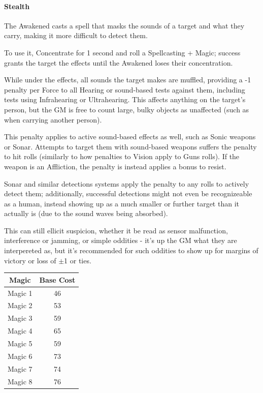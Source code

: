 \begin{multicols*}{3}
	\paragraph{Stealth}
	
	The Awakened casts a spell that masks the sounds of a target and what they carry, making it more difficult to detect them.
	
	To use it, Concentrate for 1 second and roll a Spellcasting + Magic; success grants the target the effects until the Awakened loses their concentration.
	
	While under the effects, all sounds the target makes are muffled, providing a -1 penalty per Force to all Hearing or sound-based tests against them, including tests using Infrahearing or Ultrahearing. This affects anything on the target's person, but the GM is free to count large, bulky objects as unaffected (such as when carrying another person).
	
	This penalty applies to active sound-based effects as well, such as Sonic weapons or Sonar. Attempts to target them with sound-based weapons suffers the penalty to hit rolls (similarly to how penalties to Vision apply to Guns rolls). If the weapon is an Affliction, the penalty is instead applies a bonus to resist.
	
	Sonar and similar detections systems apply the penalty to any rolls to actively detect them; additionally, successful detections might not even be recognizeable as a human, instead showing up as a much smaller or further target than it actually is (due to the sound waves being absorbed). 
	
	This can still ellicit suspicion, whether it be read as sensor malfunction, interference or jamming, or simple oddities - it's up the GM what they are interpereted as, but it's recommended for such oddities to show up for margins of victory or loss of $\pm$1 or ties.
	
	\begin{center}
		\begin{tabular}{|c|c|}
			\hline
			Magic & Base Cost \\
			\hline
			\hline
			Magic 1 & 46 \\
			Magic 2 & 53 \\
			Magic 3 & 59 \\
			Magic 4 & 65 \\
			Magic 5 & 59 \\
			Magic 6 & 73 \\
			Magic 7 & 74 \\
			Magic 8 & 76 \\
			\hline
		\end{tabular}
	\end{center}
	

\end{multicols*}
